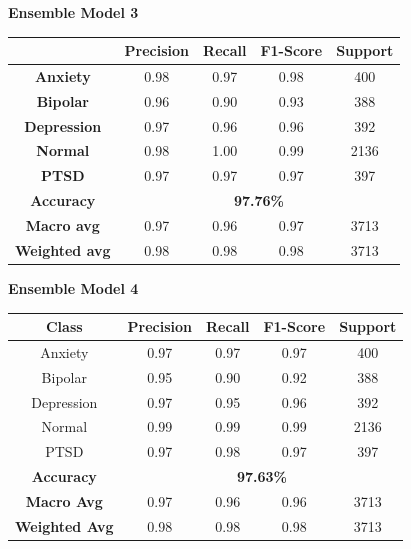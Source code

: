 \begin{center}
    \textbf{Ensemble Model 3} \\[0.2em]
    \begin{tabular}{|c|c|c|c|c|}
        \hline
        & \textbf{Precision} & \textbf{Recall} & \textbf{F1-Score} & \textbf{Support} \\ \hline
        \textbf{Anxiety}    & 0.98 & 0.97 & 0.98 & 400  \\ \hline
        \textbf{Bipolar}    & 0.96 & 0.90 & 0.93 & 388  \\ \hline
        \textbf{Depression} & 0.97 & 0.96 & 0.96 & 392  \\ \hline
        \textbf{Normal}     & 0.98 & 1.00 & 0.99 & 2136 \\ \hline
        \textbf{PTSD}       & 0.97 & 0.97 & 0.97 & 397  \\ \hline
        \textbf{Accuracy}   & \multicolumn{4}{|c|}{\textbf{97.76\%}} \\ \hline
        \textbf{Macro avg}  & 0.97 & 0.96 & 0.97 & 3713 \\ \hline
        \textbf{Weighted avg} & 0.98 & 0.98 & 0.98 & 3713 \\ \hline
    \end{tabular}
\end{center}


\begin{center}
    \textbf{Ensemble Model 4} \\[0.2em]
    \begin{tabular}{|c|c|c|c|c|}
        \hline
        \textbf{Class} & \textbf{Precision} & \textbf{Recall} & \textbf{F1-Score} & \textbf{Support} \\ \hline
        Anxiety & 0.97 & 0.97 & 0.97 & 400 \\ \hline
        Bipolar & 0.95 & 0.90 & 0.92 & 388 \\ \hline
        Depression & 0.97 & 0.95 & 0.96 & 392 \\ \hline
        Normal & 0.99 & 0.99 & 0.99 & 2136 \\ \hline
        PTSD & 0.97 & 0.98 & 0.97 & 397 \\ \hline
        \textbf{Accuracy} & \multicolumn{4}{c|}{\textbf{97.63\%}} \\ \hline
        \textbf{Macro Avg} & 0.97 & 0.96 & 0.96 & 3713 \\ \hline
        \textbf{Weighted Avg} & 0.98 & 0.98 & 0.98 & 3713 \\ \hline
    \end{tabular}
\end{center}



